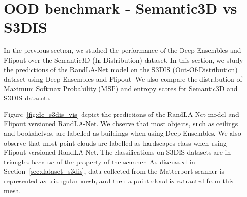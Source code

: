     \section{OOD benchmark - Semantic3D vs S3DIS}
    In the previous section, we studied the performance of the Deep Ensembles and Flipout over the Semantic3D (In-Distribution) dataset.
    In this section, we study the predictions of the RandLA-Net model on the S3DIS (Out-Of-Distribution) dataset using Deep Ensembles and Flipout.
    We also compare the distribution of Maximum Softmax Probability (MSP) and entropy scores for Semantic3D and S3DIS datasets.

    Figure~\ref{fig:de_s3dis_vis} depict the predictions of the RandLA-Net model and Flipout versioned RandLA-Net.
    We observe that most objects, such as ceilings and bookshelves, are labelled as buildings when using Deep Ensembles.
    We also observe that most point clouds are labelled as hardscapes class when using Flipout versioned RandLA-Net.
    The classifications on S3DIS datasets are in triangles because of the property of the scanner.
    As discussed in Section~\ref{sec:dataset_s3dis}, data collected from the Matterport scanner is represented as triangular mesh, and then a point cloud is extracted from this mesh.

